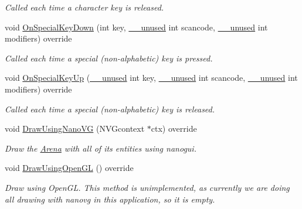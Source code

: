 \begin{DoxyCompactItemize}
\begin{DoxyCompactList}\small\item\em Called each time a character key is released. \end{DoxyCompactList}\item 
void \mbox{\hyperlink{class_graphics_arena_viewer_ab6ed6287ddf72f43f605482ce77b01a2}{On\+Special\+Key\+Down}} (int key, \mbox{\hyperlink{common_8h_a2e3484535ee610c8e19e9859563abe48}{\+\_\+\+\_\+unused}} int scancode, \mbox{\hyperlink{common_8h_a2e3484535ee610c8e19e9859563abe48}{\+\_\+\+\_\+unused}} int modifiers) override
\begin{DoxyCompactList}\small\item\em Called each time a special (non-\/alphabetic) key is pressed. \end{DoxyCompactList}\item 
void \mbox{\hyperlink{class_graphics_arena_viewer_a086e2e29e1a5745a8ee4f12996897b22}{On\+Special\+Key\+Up}} (\mbox{\hyperlink{common_8h_a2e3484535ee610c8e19e9859563abe48}{\+\_\+\+\_\+unused}} int key, \mbox{\hyperlink{common_8h_a2e3484535ee610c8e19e9859563abe48}{\+\_\+\+\_\+unused}} int scancode, \mbox{\hyperlink{common_8h_a2e3484535ee610c8e19e9859563abe48}{\+\_\+\+\_\+unused}} int modifiers) override
\begin{DoxyCompactList}\small\item\em Called each time a special (non-\/alphabetic) key is released. \end{DoxyCompactList}\item 
void \mbox{\hyperlink{class_graphics_arena_viewer_a7d59755e3f7674f382127fe135492eeb}{Draw\+Using\+Nano\+VG}} (N\+V\+Gcontext $\ast$ctx) override
\begin{DoxyCompactList}\small\item\em Draw the \mbox{\hyperlink{class_arena}{Arena}} with all of its entities using {\ttfamily nanogui}. \end{DoxyCompactList}\item 
\mbox{\label{class_graphics_arena_viewer_af894508bfa039199c6ff7f1b5a7da158}} 
void \mbox{\hyperlink{class_graphics_arena_viewer_af894508bfa039199c6ff7f1b5a7da158}{Draw\+Using\+Open\+GL}} () override
\begin{DoxyCompactList}\small\item\em Draw using {\ttfamily Open\+GL}. This method is unimplemented, as currently we are doing all drawing with {\ttfamily nanovg} in this application, so it is empty. \end{DoxyCompactList}\item 

\end{DoxyCompactItemize}
